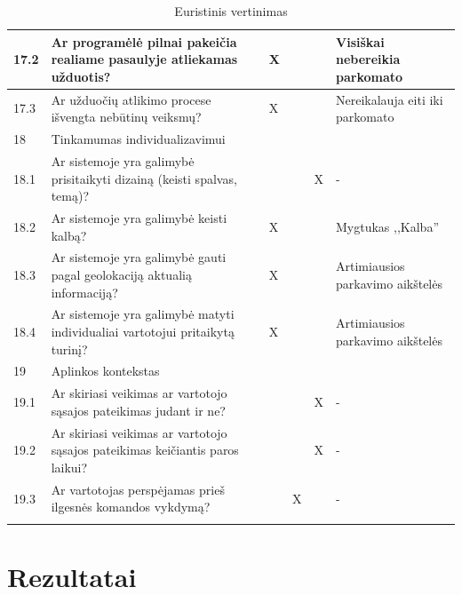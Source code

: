 \documentclass{VUMIFPSkursinis}
\begin{document}
\begin{longtable}[c]{|p{1cm}|p{4cm}|p{1cm}|p{1cm}|p{1.6cm}|p{4cm}|}
17.2  & Ar programėlė pilnai pakeičia realiame pasaulyje atliekamas užduotis?                                &  X  &     &           &   Visiškai nebereikia parkomato          \\ \hline
17.3  & Ar užduočių atlikimo procese išvengta nebūtinų veiksmų?                                              &  X  &     &           &   Nereikalauja eiti iki parkomato          \\ \hline
18    & \multicolumn{5}{l|}{Tinkamumas individualizavimui}                                                                                         \\ \hline
18.1  & Ar sistemoje yra galimybė prisitaikyti dizainą (keisti spalvas, temą)?                               &     &     &     X     &   -          \\ \hline
18.2  & Ar sistemoje yra galimybė keisti kalbą?                                                              &  X  &     &           &   Mygtukas ,,Kalba''          \\ \hline
18.3  & Ar sistemoje yra galimybė gauti pagal geolokaciją aktualią informaciją?                              &  X  &     &           &   Artimiausios parkavimo aikštelės           \\ \hline
18.4  & Ar sistemoje yra galimybė matyti individualiai vartotojui pritaikytą turinį?                         &  X  &     &           &   Artimiausios parkavimo aikštelės          \\ \hline
19    & \multicolumn{5}{l|}{Aplinkos kontekstas}                                                                                                   \\ \hline
19.1  & Ar skiriasi veikimas ar vartotojo sąsajos pateikimas judant ir ne?                                   &     &     &     X     &   -          \\ \hline
19.2  & Ar skiriasi veikimas ar vartotojo sąsajos pateikimas keičiantis paros laikui?                        &     &     &     X     &   -          \\ \hline
19.3  & Ar vartotojas perspėjamas prieš ilgesnės komandos vykdymą?                                           &     &  X  &           &   -          \\ \hline
\caption{Euristinis vertinimas}
\label{euristic}
\end{longtable}

\section{Rezultatai}
\end{document}
